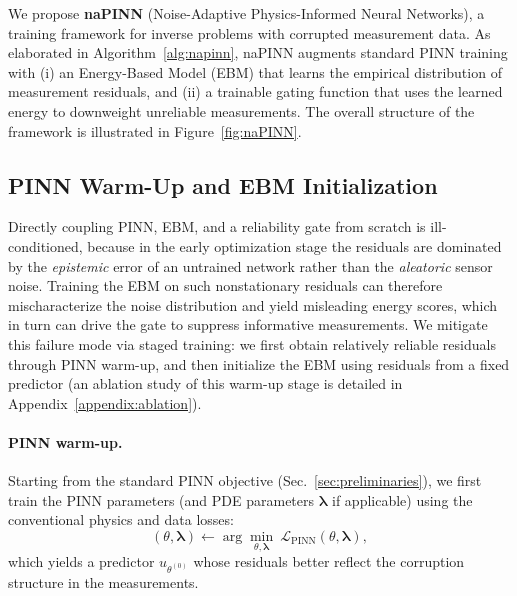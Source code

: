 \documentclass{article}
\theoremstyle{plain}
\theoremstyle{definition}
\theoremstyle{remark}
\begin{document}
We propose \textbf{naPINN} (Noise-Adaptive Physics-Informed Neural Networks), a training framework for inverse problems with corrupted measurement data. As elaborated in Algorithm~\ref{alg:napinn}, naPINN augments standard PINN training with (i) an Energy-Based Model (EBM) that learns the empirical distribution of measurement residuals, and (ii) a trainable gating function that uses the learned energy to downweight unreliable measurements. The overall structure of the framework is illustrated in Figure~\ref{fig:naPINN}.

\subsection{PINN Warm-Up and EBM Initialization}
\label{subsec:stage1}
Directly coupling PINN, EBM, and a reliability gate from scratch is ill-conditioned, because in the early optimization stage the residuals are dominated by the \emph{epistemic} error of an untrained network rather than the \emph{aleatoric} sensor noise. Training the EBM on such nonstationary residuals can therefore mischaracterize the noise distribution and yield misleading energy scores, which in turn can drive the gate to suppress informative measurements. We mitigate this failure mode via staged training: we first obtain relatively reliable residuals through PINN warm-up, and then initialize the EBM using residuals from a fixed predictor (an ablation study of this warm-up stage is detailed in Appendix~\ref{appendix:ablation}).

\paragraph{PINN warm-up.}
Starting from the standard PINN objective (Sec.~\ref{sec:preliminaries}), we first train the PINN parameters (and PDE parameters $\boldsymbol{\lambda}$ if applicable) using the conventional physics and data losses:
\begin{equation}
(\theta,\boldsymbol{\lambda}) \leftarrow 
\arg\min_{\theta,\boldsymbol{\lambda}} \ \mathcal{L}_{\text{PINN}}(\theta,\boldsymbol{\lambda}),
\label{eq:warmup}
\end{equation}
which yields a predictor $u_{\theta^{(0)}}$ whose residuals better reflect the corruption structure in the measurements.
\end{document}
